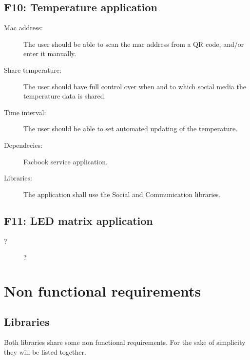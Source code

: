 \subsection{F10: Temperature application}
\begin{description}
	\item[Mac address:] The user should be able to scan the mac address from a QR code, and/or enter it manually. 
	\item[Share temperature:] The user should have full control over when and to which social media the temperature data is shared.
	\item[Time interval:] The user should be able to set automated updating of the temperature.
	\item[Dependecies:] Facbook service application.
	\item[Libraries:] The application shall use the Social and Communication libraries.
\end{description}

\subsection{F11: LED matrix application}
\begin{description}
	\item[?] ?
\end{description}

\newpage

\section{Non functional requirements}

\subsection{Libraries}

Both libraries share some non functional requirements.
For the sake of simplicity they will be listed together.

